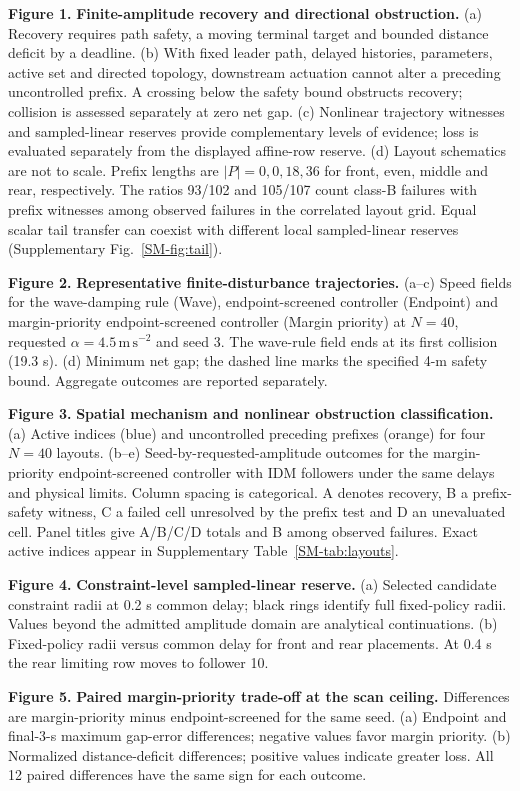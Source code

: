 \documentclass[12pt]{article}
\begin{document}
\noindent\textbf{Figure 1.} \textbf{Finite-amplitude recovery and directional obstruction.} (a) Recovery requires path safety, a moving terminal target and bounded distance deficit by a deadline. (b) With fixed leader path, delayed histories, parameters, active set and directed topology, downstream actuation cannot alter a preceding uncontrolled prefix. A crossing below the safety bound obstructs recovery; collision is assessed separately at zero net gap. (c) Nonlinear trajectory witnesses and sampled-linear reserves provide complementary levels of evidence; loss is evaluated separately from the displayed affine-row reserve. (d) Layout schematics are not to scale. Prefix lengths are $|P|=0,0,18,36$ for front, even, middle and rear, respectively. The ratios 93/102 and 105/107 count class-B failures with prefix witnesses among observed failures in the correlated layout grid. Equal scalar tail transfer can coexist with different local sampled-linear reserves (Supplementary Fig.~\ref{SM-fig:tail}).

\noindent\textbf{Figure 2.} \textbf{Representative finite-disturbance trajectories.} (a--c) Speed fields for the wave-damping rule (Wave), endpoint-screened controller (Endpoint) and margin-priority endpoint-screened controller (Margin priority) at $N=40$, requested $\alpha=4.5\,\mathrm{m\,s^{-2}}$ and seed 3. The wave-rule field ends at its first collision (19.3 s). (d) Minimum net gap; the dashed line marks the specified 4-m safety bound. Aggregate outcomes are reported separately.

\noindent\textbf{Figure 3.} \textbf{Spatial mechanism and nonlinear obstruction classification.} (a) Active indices (blue) and uncontrolled preceding prefixes (orange) for four $N=40$ layouts. (b--e) Seed-by-requested-amplitude outcomes for the margin-priority endpoint-screened controller with IDM followers under the same delays and physical limits. Column spacing is categorical. A denotes recovery, B a prefix-safety witness, C a failed cell unresolved by the prefix test and D an unevaluated cell. Panel titles give A/B/C/D totals and B among observed failures. Exact active indices appear in Supplementary Table~\ref{SM-tab:layouts}.

\noindent\textbf{Figure 4.} \textbf{Constraint-level sampled-linear reserve.} (a) Selected candidate constraint radii at 0.2 s common delay; black rings identify full fixed-policy radii. Values beyond the admitted amplitude domain are analytical continuations. (b) Fixed-policy radii versus common delay for front and rear placements. At 0.4 s the rear limiting row moves to follower 10.

\noindent\textbf{Figure 5.} \textbf{Paired margin-priority trade-off at the scan ceiling.} Differences are margin-priority minus endpoint-screened for the same seed. (a) Endpoint and final-3-s maximum gap-error differences; negative values favor margin priority. (b) Normalized distance-deficit differences; positive values indicate greater loss. All 12 paired differences have the same sign for each outcome.
\end{document}
